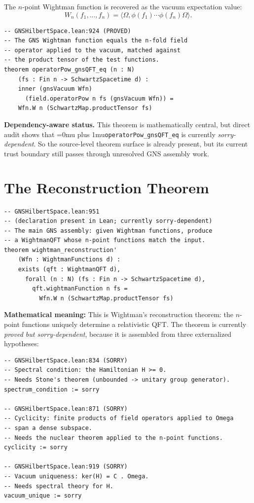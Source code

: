 \documentclass[11pt,a4paper]{article}
\newcommand{\leanname}[1]{\begingroup\Urlmuskip=0mu plus 1mu\relax\nolinkurl{#1}\endgroup}
\begin{document}
The $n$-point Wightman function is recovered as the vacuum expectation value:
\[
W_n(f_1, \ldots, f_n) = \langle \Omega, \phi(f_1) \cdots \phi(f_n) \Omega \rangle.
\]

\begin{lstlisting}
-- GNSHilbertSpace.lean:924 (PROVED)
-- The GNS Wightman function equals the n-fold field
-- operator applied to the vacuum, matched against
-- the product tensor of the test functions.
theorem operatorPow_gnsQFT_eq (n : N)
    (fs : Fin n -> SchwartzSpacetime d) :
    inner (gnsVacuum Wfn)
      (field.operatorPow n fs (gnsVacuum Wfn)) =
    Wfn.W n (SchwartzMap.productTensor fs)
\end{lstlisting}

\medskip\noindent
\textbf{Dependency-aware status.}
This theorem is mathematically central, but direct audit shows that
\leanname{operatorPow\_gnsQFT\_eq} is currently \emph{sorry-dependent}. So the
source-level theorem surface is already present, but its current trust boundary
still passes through unresolved GNS assembly work.

\section{The Reconstruction Theorem}

\begin{lstlisting}
-- GNSHilbertSpace.lean:951
-- (declaration present in Lean; currently sorry-dependent)
-- The main GNS assembly: given Wightman functions, produce
-- a WightmanQFT whose n-point functions match the input.
theorem wightman_reconstruction'
    (Wfn : WightmanFunctions d) :
    exists (qft : WightmanQFT d),
      forall (n : N) (fs : Fin n -> SchwartzSpacetime d),
        qft.wightmanFunction n fs =
          Wfn.W n (SchwartzMap.productTensor fs)
\end{lstlisting}

\noindent\textbf{Mathematical meaning:} This is Wightman's reconstruction
theorem: the $n$-point functions uniquely determine a relativistic QFT.
The theorem is currently \emph{proved but sorry-dependent}, because it is assembled
from three externalized hypotheses:

\begin{lstlisting}[style=leansorry]
-- GNSHilbertSpace.lean:834 (SORRY)
-- Spectral condition: the Hamiltonian H >= 0.
-- Needs Stone's theorem (unbounded -> unitary group generator).
spectrum_condition := sorry

-- GNSHilbertSpace.lean:871 (SORRY)
-- Cyclicity: finite products of field operators applied to Omega
-- span a dense subspace.
-- Needs the nuclear theorem applied to the n-point functions.
cyclicity := sorry

-- GNSHilbertSpace.lean:919 (SORRY)
-- Vacuum uniqueness: ker(H) = C . Omega.
-- Needs spectral theory for H.
vacuum_unique := sorry
\end{lstlisting}
\end{document}
